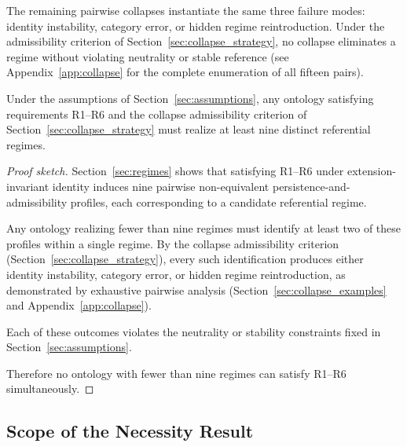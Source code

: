 The remaining pairwise collapses instantiate the same three failure modes:
identity instability, category error, or hidden regime reintroduction.
Under the admissibility criterion of Section~\ref{sec:collapse_strategy},
no collapse eliminates a regime without violating neutrality or stable
reference (see Appendix~\ref{app:collapse} for the complete enumeration
of all fifteen pairs).


\begin{lemma}
\label{lem:necessity}
Under the assumptions of Section~\ref{sec:assumptions},
any ontology satisfying requirements R1--R6
and the collapse admissibility criterion of
Section~\ref{sec:collapse_strategy}
must realize at least nine distinct
referential regimes.
\end{lemma}

\begin{proof}[Proof sketch]
Section~\ref{sec:regimes} shows that satisfying R1--R6
under extension-invariant identity induces nine
pairwise non-equivalent persistence-and-admissibility profiles,
each corresponding to a candidate referential regime.

Any ontology realizing fewer than nine regimes must
identify at least two of these profiles within a single regime.
By the collapse admissibility criterion
(Section~\ref{sec:collapse_strategy}),
every such identification produces either
identity instability, category error, or hidden regime reintroduction,
as demonstrated by exhaustive pairwise analysis (Section~\ref{sec:collapse_examples}
and Appendix~\ref{app:collapse}).

Each of these outcomes violates the neutrality
or stability constraints fixed in
Section~\ref{sec:assumptions}.

Therefore no ontology with fewer than nine regimes
can satisfy R1--R6 simultaneously.
\end{proof}

\subsection{Scope of the Necessity Result}

